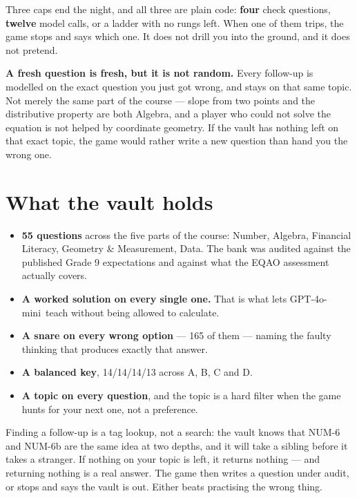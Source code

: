 \documentclass[11pt]{article}
\newcommand{\themodel}{GPT-4o-mini}
\begin{document}
Three caps end the night, and all three are plain code: \textbf{four} check
questions, \textbf{twelve} model calls, or a ladder with no rungs left. When
one of them trips, the game stops and says which one. It does not drill you
into the ground, and it does not pretend.

\begin{quietbox}
\textbf{A fresh question is fresh, but it is not random.} Every follow-up is
modelled on the exact question you just got wrong, and stays on that same
topic. Not merely the same part of the course --- slope from two points and the
distributive property are both Algebra, and a player who could not solve the
equation is not helped by coordinate geometry. If the vault has nothing left on
that exact topic, the game would rather write a new question than hand you the
wrong one.
\end{quietbox}

\section{What the vault holds}

\begin{itemize}
  \item \textbf{55 questions} across the five parts of the course: Number,
        Algebra, Financial Literacy, Geometry \& Measurement, Data. The bank
        was audited against the published Grade 9 expectations and against what the
        EQAO assessment actually covers.
  \item \textbf{A worked solution on every single one.} That is what lets
        \themodel\ teach without being allowed to calculate.
  \item \textbf{A snare on every wrong option} --- 165 of them --- naming the
        faulty thinking that produces exactly that answer.
  \item \textbf{A balanced key}, 14/14/14/13 across A, B, C and D.
  \item \textbf{A topic on every question}, and the topic is a hard filter when
        the game hunts for your next one, not a preference.
\end{itemize}

Finding a follow-up is a tag lookup, not a search: the vault knows that NUM-6
and NUM-6b are the same idea at two depths, and it will take a sibling before
it takes a stranger. If nothing on your topic is left, it returns nothing ---
and returning nothing is a real answer. The game then writes a question under
audit, or stops and says the vault is out. Either beats practising the wrong
thing.
\end{document}
